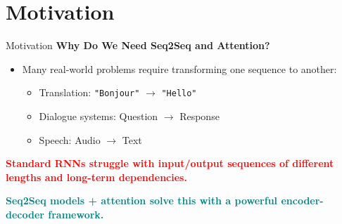 \section{Motivation}
\begin{frame}{Motivation}
    \textbf{Why Do We Need Seq2Seq and Attention?}
    \begin{itemize}
      \item[\textcolor{red}{$\blacktriangleright$}] Many real-world problems require transforming one sequence to another:
      \begin{itemize}
        \item Translation: \texttt{"Bonjour"} $\rightarrow$ \texttt{"Hello"}
        \item Dialogue systems: Question $\rightarrow$ Response
        \item Speech: Audio $\rightarrow$ Text
      \end{itemize}
    \end{itemize}
    \vspace{1em}
    \textcolor{red}{\textbf{Standard RNNs struggle with input/output sequences of different lengths and long-term dependencies.}}
    \vspace{1em}
  
    \textcolor{teal}{\textbf{Seq2Seq models + attention solve this with a powerful encoder-decoder framework.}}
  \end{frame}